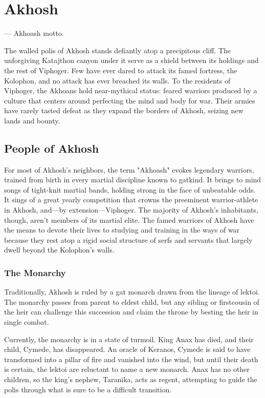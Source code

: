 \section{Akhosh} \label{sec::akhosh}

\hspace*{\fill} --- Akhoash motto.

The walled polis of Akhosh stands defiantly atop a precipitous cliff.
The unforgiving Katajthon canyon under it serve as a shield between its holdings and the rest of Viphoger.
Few have ever dared to attack its famed fortress, the Kolophon, and no attack has ever breached its walls.
To the residents of Viphoger, the Akhoans hold near-mythical status: feared warriors produced by a culture that centers around perfecting the mind and body for war.
Their armies have rarely tasted defeat as they expand the borders of Akhosh, seizing new lands and bounty.

\subsection*{People of Akhosh} \label{ssec::peopleofakhosh}
    For most of Akhosh's neighbors, the term "Akhoash" evokes legendary warriors, trained from birth in every martial discipline known to gatkind.
    It brings to mind songs of tight-knit martial bands, holding strong in the face of unbeatable odds.
    It sings of a great yearly competition that crowns the preeminent warrior-athlete in Akhosh, and—by extension—Viphoger.
    The majority of Akhosh's inhabitants, though, aren't members of its martial elite.
    The famed warriors of Akhosh have the means to devote their lives to studying and training in the ways of war because they rest atop a rigid social structure of serfs and servants that largely dwell beyond the Kolophon's walls.

    \subsubsection{The Monarchy}
        Traditionally, Akhosh is ruled by a gat monarch drawn from the lineage of lektoi.
        The monarchy passes from parent to eldest child, but any sibling or firstcousin of the heir can challenge this succession and claim the throne by besting the heir in single combat.

        Currently, the monarchy is in a state of turmoil.
        King Anax has died, and their child, Cymede, has disappeared.
        An oracle of Keranos, Cymede is said to have transformed into a pillar of fire and vanished into the wind, but until their death is certain, the lektoi are reluctant to name a new monarch.
        Anax has no other children, so the king's nephew, Taranika, acts as regent, attempting to guide the polis through what is sure to be a difficult transition.

